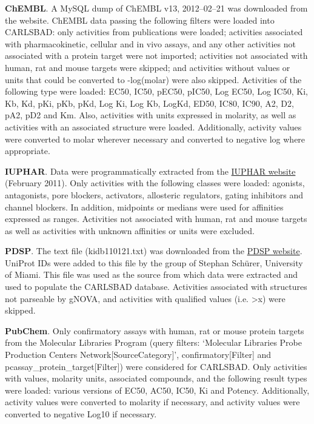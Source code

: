 \textbf{ChEMBL}. A MySQL dump of ChEMBL v13, 2012–02–21 was downloaded from the website. ChEMBL data passing the following filters were loaded into CARLSBAD: only activities from publications were loaded; activities associated with pharmacokinetic, cellular and in vivo assays, and any other activities not associated with a protein target were not imported; activities not associated with human, rat and mouse targets were skipped; and activities without values or units that could be converted to -log(molar) were also skipped. Activities of the following type were loaded: EC50, IC50, pEC50, pIC50, Log EC50, Log IC50, Ki, Kb, Kd, pKi, pKb, pKd, Log Ki, Log Kb, LogKd, ED50, IC80, IC90, A2, D2, pA2, pD2 and Km. Also, activities with units expressed in molarity, as well as activities with an associated structure were loaded. Additionally, activity values were converted to molar wherever necessary and converted to negative log where appropriate.

\textbf{IUPHAR}. Data were programmatically extracted from the \href{http://www.iuphar-db.org/}{IUPHAR website} (February 2011). Only activities with the following classes were loaded: agonists, antagonists, pore blockers, activators, allosteric regulators, gating inhibitors and channel blockers. In addition, midpoints or medians were used for affinities expressed as ranges. Activities not associated with human, rat and mouse targets as well as activities with unknown affinities or units were excluded.

\textbf{PDSP}. The text file (kidb110121.txt) was downloaded from the \href{http://pdsp.med.unc.edu/indexR.html}{PDSP website}. UniProt IDs were added to this file by the group of Stephan Sch\"{u}rer, University of Miami. This file was used as the source from which data were extracted and used to populate the CARLSBAD database. Activities associated with structures not parseable by gNOVA, and activities with qualified values (i.e. \textgreater x) were skipped.

\textbf{PubChem}. Only confirmatory assays with human, rat or mouse protein targets from the Molecular Libraries Program (query filters: ‘Molecular Libraries Probe Production Centers Network[SourceCategory]’, confirmatory[Filter] and pcassay\_protein\_target[Filter]) were considered for CARLSBAD. Only activities with values, molarity units, associated compounds, and the following result types were loaded: various versions of EC50, AC50, IC50, Ki and Potency. Additionally, activity values were converted to molarity if necessary, and activity values were converted to negative Log10 if necessary.

